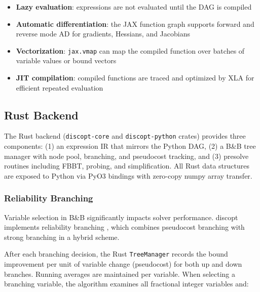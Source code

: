 \documentclass[12pt,preprint]{article}
\begin{document}
\begin{itemize}
\item \textbf{Lazy evaluation}: expressions are not evaluated until the DAG is compiled

\item \textbf{Automatic differentiation}: the JAX function graph supports forward and reverse mode AD for gradients, Hessians, and Jacobians

\item \textbf{Vectorization}: \texttt{jax.vmap} can map the compiled function over batches of variable values or bound vectors

\item \textbf{JIT compilation}: compiled functions are traced and optimized by XLA for efficient repeated evaluation

\end{itemize}

\subsection{Rust Backend}
\label{org-rust-backend}
The Rust backend (\texttt{discopt-core} and \texttt{discopt-python} crates) provides three components: (1) an expression IR that mirrors the Python DAG, (2) a B\&B tree manager with node pool, branching, and pseudocost tracking, and (3) presolve routines including FBBT, probing, and simplification. All Rust data structures are exposed to Python via PyO3 bindings \cite{pyo3} with zero-copy numpy array transfer.

\subsubsection{Reliability Branching}
\label{org-reliability-branching}
Variable selection in B\&B significantly impacts solver performance. discopt implements reliability branching \cite{Achterberg2005}, which combines pseudocost branching with strong branching in a hybrid scheme.

After each branching decision, the Rust \texttt{TreeManager} records the bound improvement per unit of variable change (pseudocost) for both up and down branches. Running averages are maintained per variable. When selecting a branching variable, the algorithm examines all fractional integer variables and:
\end{document}
